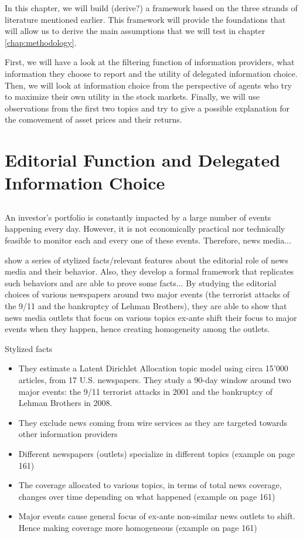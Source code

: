 In this chapter, we will build (derive?) a framework based on the three strands of literature mentioned earlier. This framework will provide the foundations that will allow us to derive the main assumptions that we will test in chapter \ref{chap:methodology}.

First, we will have a look at the filtering function of information providers, what information they choose to report and the utility of delegated information choice.
Then, we will look at information choice from the perspective of agents who try to maximize their own utility in the stock markets.
Finally, we will use observations from the first two topics and try to give a possible explanation for the comovement of asset prices and their returns.


\section{Editorial Function and Delegated Information Choice}

\subsection{\textcite{Nimark2019}}

An investor's portfolio is constantly impacted by a large number of events happening every day. However, it is not economically practical nor technically feasible to monitor each and every one of these events. Therefore, news media... 

\textcite{Nimark2019} show a series of stylized facts/relevant features about the editorial role of news media and their behavior. Also, they develop a formal framework that replicates such behaviors and are able to prove some facts...
By studying the editorial choices of various newspapers around two major events (the terrorist attacks of the 9/11 and the bankruptcy of Lehman Brothers), they are able to show that news media outlets that focus on various topics ex-ante shift their focus to major events when they happen, hence creating homogeneity among the outlets.

Stylized facts
\begin{itemize}
    \item They estimate a Latent Dirichlet Allocation topic model using circa 15'000 articles, from 17 U.S. newspapers. They study a 90-day window around two major events: the 9/11 terrorist attacks in 2001 and the bankruptcy of Lehman Brothers in 2008.
    \item They exclude news coming from wire services as they are targeted towards other information providers
    \item Different newspapers (outlets) specialize in different topics (example on page 161)
    \item The coverage allocated to various topics, in terms of total news coverage, changes over time depending on what happened (example on page 161)
    \item Major events cause general focus of ex-ante non-similar news outlets to shift. Hence making coverage more homogeneous (example on page 161)
\end{itemize}


